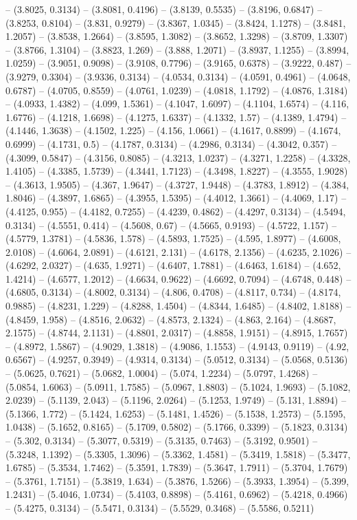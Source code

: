 -- (3.8025, 0.3134) -- (3.8081, 0.4196) -- (3.8139, 0.5535) -- (3.8196, 0.6847) -- (3.8253, 0.8104) -- (3.831, 0.9279) -- (3.8367, 1.0345) -- (3.8424, 1.1278) -- (3.8481, 1.2057) -- (3.8538, 1.2664) -- (3.8595, 1.3082) -- (3.8652, 1.3298) -- (3.8709, 1.3307) -- (3.8766, 1.3104) -- (3.8823, 1.269) -- (3.888, 1.2071) -- (3.8937, 1.1255) -- (3.8994, 1.0259) -- (3.9051, 0.9098) -- (3.9108, 0.7796) -- (3.9165, 0.6378) -- (3.9222, 0.487) -- (3.9279, 0.3304) -- (3.9336, 0.3134) -- (4.0534, 0.3134) -- (4.0591, 0.4961) -- (4.0648, 0.6787) -- (4.0705, 0.8559) -- (4.0761, 1.0239) -- (4.0818, 1.1792) -- (4.0876, 1.3184) -- (4.0933, 1.4382) -- (4.099, 1.5361) -- (4.1047, 1.6097) -- (4.1104, 1.6574) -- (4.116, 1.6776) -- (4.1218, 1.6698) -- (4.1275, 1.6337) -- (4.1332, 1.57) -- (4.1389, 1.4794) -- (4.1446, 1.3638) -- (4.1502, 1.225) -- (4.156, 1.0661) -- (4.1617, 0.8899) -- (4.1674, 0.6999) -- (4.1731, 0.5) -- (4.1787, 0.3134) -- (4.2986, 0.3134) -- (4.3042, 0.357) -- (4.3099, 0.5847) -- (4.3156, 0.8085) -- (4.3213, 1.0237) -- (4.3271, 1.2258) -- (4.3328, 1.4105) -- (4.3385, 1.5739) -- (4.3441, 1.7123) -- (4.3498, 1.8227) -- (4.3555, 1.9028) -- (4.3613, 1.9505) -- (4.367, 1.9647) -- (4.3727, 1.9448) -- (4.3783, 1.8912) -- (4.384, 1.8046) -- (4.3897, 1.6865) -- (4.3955, 1.5395) -- (4.4012, 1.3661) -- (4.4069, 1.17) -- (4.4125, 0.955) -- (4.4182, 0.7255) -- (4.4239, 0.4862) -- (4.4297, 0.3134) -- (4.5494, 0.3134) -- (4.5551, 0.414) -- (4.5608, 0.67) -- (4.5665, 0.9193) -- (4.5722, 1.157) -- (4.5779, 1.3781) -- (4.5836, 1.578) -- (4.5893, 1.7525) -- (4.595, 1.8977) -- (4.6008, 2.0108) -- (4.6064, 2.0891) -- (4.6121, 2.131) -- (4.6178, 2.1356) -- (4.6235, 2.1026) -- (4.6292, 2.0327) -- (4.635, 1.9271) -- (4.6407, 1.7881) -- (4.6463, 1.6184) -- (4.652, 1.4214) -- (4.6577, 1.2012) -- (4.6634, 0.9622) -- (4.6692, 0.7094) -- (4.6748, 0.448) -- (4.6805, 0.3134) -- (4.8002, 0.3134) -- (4.806, 0.4708) -- (4.8117, 0.734) -- (4.8174, 0.9885) -- (4.8231, 1.229) -- (4.8288, 1.4504) -- (4.8344, 1.6485) -- (4.8402, 1.8188) -- (4.8459, 1.958) -- (4.8516, 2.0632) -- (4.8573, 2.1324) -- (4.863, 2.164) -- (4.8687, 2.1575) -- (4.8744, 2.1131) -- (4.8801, 2.0317) -- (4.8858, 1.9151) -- (4.8915, 1.7657) -- (4.8972, 1.5867) -- (4.9029, 1.3818) -- (4.9086, 1.1553) -- (4.9143, 0.9119) -- (4.92, 0.6567) -- (4.9257, 0.3949) -- (4.9314, 0.3134) -- (5.0512, 0.3134) -- (5.0568, 0.5136) -- (5.0625, 0.7621) -- (5.0682, 1.0004) -- (5.074, 1.2234) -- (5.0797, 1.4268) -- (5.0854, 1.6063) -- (5.0911, 1.7585) -- (5.0967, 1.8803) -- (5.1024, 1.9693) -- (5.1082, 2.0239) -- (5.1139, 2.043) -- (5.1196, 2.0264) -- (5.1253, 1.9749) -- (5.131, 1.8894) -- (5.1366, 1.772) -- (5.1424, 1.6253) -- (5.1481, 1.4526) -- (5.1538, 1.2573) -- (5.1595, 1.0438) -- (5.1652, 0.8165) -- (5.1709, 0.5802) -- (5.1766, 0.3399) -- (5.1823, 0.3134) -- (5.302, 0.3134) -- (5.3077, 0.5319) -- (5.3135, 0.7463) -- (5.3192, 0.9501) -- (5.3248, 1.1392) -- (5.3305, 1.3096) -- (5.3362, 1.4581) -- (5.3419, 1.5818) -- (5.3477, 1.6785) -- (5.3534, 1.7462) -- (5.3591, 1.7839) -- (5.3647, 1.7911) -- (5.3704, 1.7679) -- (5.3761, 1.7151) -- (5.3819, 1.634) -- (5.3876, 1.5266) -- (5.3933, 1.3954) -- (5.399, 1.2431) -- (5.4046, 1.0734) -- (5.4103, 0.8898) -- (5.4161, 0.6962) -- (5.4218, 0.4966) -- (5.4275, 0.3134) -- (5.5471, 0.3134) -- (5.5529, 0.3468) -- (5.5586, 0.5211) 